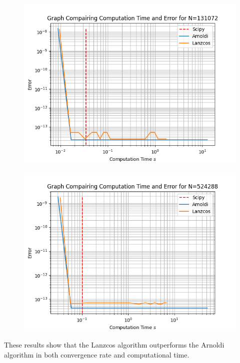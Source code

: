 \documentclass{article}
\begin{document}
\begin{figure}[H]
    \centering
    \begin{minipage}{0.5\textwidth}
       \centering
	  \includegraphics[width=\linewidth]{Plots/Comp Time v E Results for N=131072.png}
	  \label{fig:MEe7}
    \end{minipage}\hfill
    \begin{minipage}{0.5\textwidth}
       \centering
	  \includegraphics[width=\linewidth]{Plots/Comp Time v E Results for N=524288.png}
	  \label{fig:MEe6}
    \end{minipage}
\end{figure}
These results show that the Lanzcos algorithm outperforms the Arnoldi algorithm in both convergence rate and computational time.
\end{document}
